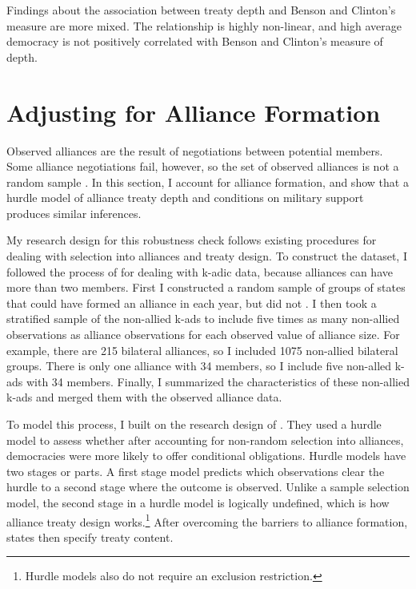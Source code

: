 \documentclass[12pt]{article}
\begin{document}
Findings about the association between treaty depth and Benson and Clinton's measure are more mixed. 
The relationship is highly non-linear, and high average democracy is not positively correlated with Benson and Clinton's measure of depth. 



\section{Adjusting for Alliance Formation}


Observed alliances are the result of negotiations between potential members. 
Some alliance negotiations fail, however, so the set of observed alliances is not a random sample \citep{Poast2019a}. 
In this section, I account for alliance formation, and show that a hurdle model of alliance treaty depth and conditions on military support produces similar inferences. 


My research design for this robustness check follows existing procedures for dealing with selection into alliances and treaty design. 
To construct the dataset, I followed the process of \citet{Poast2010} for dealing with k-adic data, because alliances can have more than two members. 
First I constructed a random sample of groups of states that could have formed an alliance in each year, but did not \citep{FordhamPoast2014}.
I then took a stratified sample of the non-allied k-ads to include five times as many non-allied observations as alliance observations for each observed value of alliance size. 
For example, there are 215 bilateral alliances, so I included 1075 non-allied bilateral groups. 
There is only one alliance with 34 members, so I include five non-alled k-ads with 34 members. 
Finally, I summarized the characteristics of these non-allied k-ads and merged them with the observed alliance data. 


To model this process, I built on the research design of \citet{Chibaetal2015}. 
They used a hurdle model to assess whether after accounting for non-random selection into alliances, democracies were more likely to offer conditional obligations.
Hurdle models have two stages or parts.
A first stage model predicts which observations clear the hurdle to a second stage where the outcome is observed. 
Unlike a sample selection model, the second stage in a hurdle model is logically undefined, which is how alliance treaty design works.\footnote{Hurdle models also do not require an exclusion restriction.} 
After overcoming the barriers to alliance formation, states then specify treaty content. 
\end{document}
